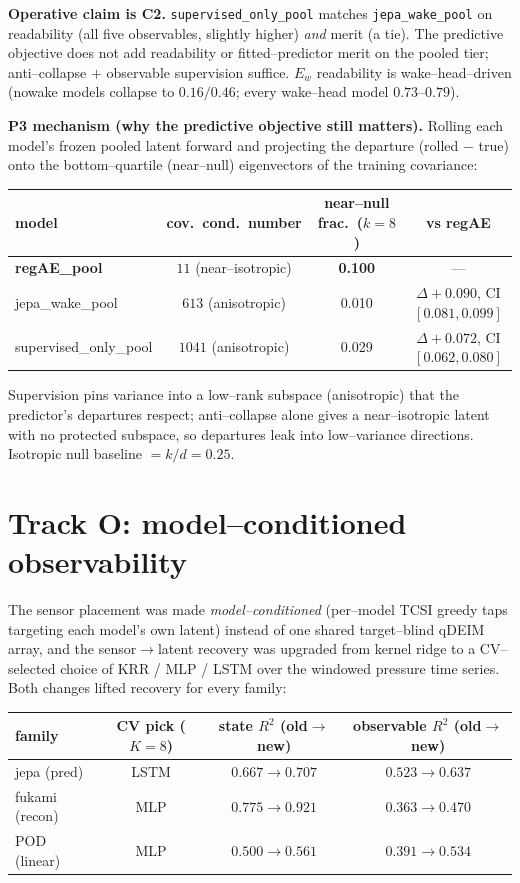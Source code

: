 \documentclass[11pt]{article}
\begin{document}
\textbf{Operative claim is C2.} \texttt{supervised\_only\_pool} matches \texttt{jepa\_wake\_pool}
on readability (all five observables, slightly higher) \emph{and} merit (a tie). The predictive
objective does not add readability or fitted--predictor merit on the pooled tier; anti--collapse
$+$ observable supervision suffice. $E_w$ readability is wake--head--driven (nowake models
collapse to $0.16/0.46$; every wake--head model $0.73$--$0.79$).

\textbf{P3 mechanism (why the predictive objective still matters).} Rolling each model's frozen
pooled latent forward and projecting the departure (rolled $-$ true) onto the bottom--quartile
(near--null) eigenvectors of the training covariance:

\begin{center}
\begin{tabular}{@{}lccc@{}}
\toprule
model & cov.\ cond.\ number & near--null frac.\ ($k{=}8$) & vs regAE \\
\midrule
\textbf{regAE\_pool} & $11$ (near--isotropic) & \textbf{0.100} & --- \\
jepa\_wake\_pool     & $613$ (anisotropic) & 0.010 & $\Delta{+}0.090$, CI $[0.081,0.099]$ \\
supervised\_only\_pool & $1041$ (anisotropic) & 0.029 & $\Delta{+}0.072$, CI $[0.062,0.080]$ \\
\bottomrule
\end{tabular}
\end{center}
Supervision pins variance into a low--rank subspace (anisotropic) that the predictor's departures
respect; anti--collapse alone gives a near--isotropic latent with no protected subspace, so
departures leak into low--variance directions. Isotropic null baseline $=k/d=0.25$.

\section{Track O: model--conditioned observability}

The sensor placement was made \emph{model--conditioned} (per--model TCSI greedy taps targeting
each model's own latent) instead of one shared target--blind qDEIM array, and the
sensor$\to$latent recovery was upgraded from kernel ridge to a CV--selected choice of
KRR / MLP / LSTM over the windowed pressure time series. Both changes lifted recovery for every
family:

\begin{center}
\begin{tabular}{@{}lccc@{}}
\toprule
family & CV pick ($K{=}8$) & state $R^2$ (old$\to$new) & observable $R^2$ (old$\to$new) \\
\midrule
jepa (pred)   & LSTM & $0.667\to 0.707$ & $0.523\to \mathbf{0.637}$ \\
fukami (recon)& MLP  & $0.775\to 0.921$ & $0.363\to 0.470$ \\
POD (linear)  & MLP  & $0.500\to 0.561$ & $0.391\to 0.534$ \\
\bottomrule
\end{tabular}
\end{center}
\end{document}
